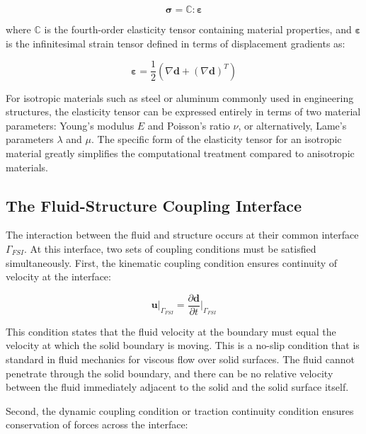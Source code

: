 ﻿\documentclass[a4paper,11pt]{article}
\theoremstyle{definition}
\begin{document}
\begin{equation}
\boldsymbol{\sigma} = \mathbb{C} : \boldsymbol{\varepsilon}
\label{eq:hooke_law}
\end{equation}

where $\mathbb{C}$ is the fourth-order elasticity tensor containing material properties, and $\boldsymbol{\varepsilon}$ is the infinitesimal strain tensor defined in terms of displacement gradients as:

\begin{equation}
\boldsymbol{\varepsilon} = \frac{1}{2}\left(\nabla \mathbf{d} + (\nabla \mathbf{d})^T\right)
\label{eq:strain}
\end{equation}

For isotropic materials such as steel or aluminum commonly used in engineering structures, the elasticity tensor can be expressed entirely in terms of two material parameters: Young's modulus $E$ and Poisson's ratio $\nu$, or alternatively, Lame's parameters $\lambda$ and $\mu$. The specific form of the elasticity tensor for an isotropic material greatly simplifies the computational treatment compared to anisotropic materials.

\subsection{The Fluid-Structure Coupling Interface}

The interaction between the fluid and structure occurs at their common interface $\Gamma_{FSI}$. At this interface, two sets of coupling conditions must be satisfied simultaneously. First, the kinematic coupling condition ensures continuity of velocity at the interface:

\begin{equation}
\mathbf{u}|_{\Gamma_{FSI}} = \frac{\partial \mathbf{d}}{\partial t}\bigg|_{\Gamma_{FSI}}
\label{eq:kinematic_coupling}
\end{equation}

This condition states that the fluid velocity at the boundary must equal the velocity at which the solid boundary is moving. This is a no-slip condition that is standard in fluid mechanics for viscous flow over solid surfaces. The fluid cannot penetrate through the solid boundary, and there can be no relative velocity between the fluid immediately adjacent to the solid and the solid surface itself.

Second, the dynamic coupling condition or traction continuity condition ensures conservation of forces across the interface:
\end{document}
